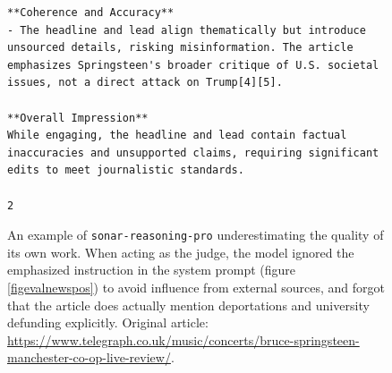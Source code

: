 \documentclass[UTF8,noindent,nohyp,parspace,titlepage,twoside,12pt]{article}
\begin{document}
\begin{figure}[!hbtp]
\begin{lstlisting}[basicstyle=\tiny\sffamily,frame=single,linewidth=\textwidth]
**Coherence and Accuracy**
- The headline and lead align thematically but introduce unsourced details, risking misinformation. The article
emphasizes Springsteen's broader critique of U.S. societal issues, not a direct attack on Trump[4][5].

**Overall Impression**
While engaging, the headline and lead contain factual inaccuracies and unsupported claims, requiring significant
edits to meet journalistic standards.

2
      \end{lstlisting}
      \caption{%
        An example of \texttt{sonar-reasoning-pro} underestimating the quality
        of its own work. When acting as the judge, the model ignored the
        emphasized instruction in the system prompt (figure
        \ref{figevalnewspos}) to avoid influence from external sources, and
        forgot that the article does actually mention deportations and
        university defunding explicitly. Original article:
        \url{https://www.telegraph.co.uk/music/concerts/bruce-springsteen-manchester-co-op-live-review/}.
      }
    \end{figure}
\end{document}

